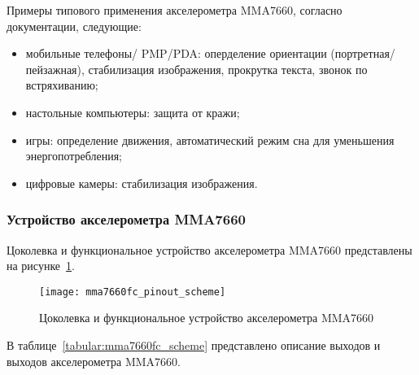 \documentclass[document.tex]{subfiles}
\begin{document}
\noindent
Примеры типового применения акселерометра MMA7660, согласно документации, следующие:
\begin{itemize} 
	\item мобильные телефоны/ PMP/PDA: оперделение ориентации (портретная/пейзажная), стабилизация изображения, прокрутка текста, звонок по встряхиванию;
	\item настольные компьютеры: защита от кражи;
	\item игры: определение движения, автоматический режим сна для уменьшения энерго\-потребления;
	\item цифровые камеры: стабилизация изображения. \cite{accelerometer_mma7660}
\end{itemize}

\clearpage
\subsubsection{Устройство акселерометра MMA7660}
Цоколевка и функциональное устройство акселерометра MMA7660 представлены на ри\-сунке~\ref{fig:mma7660fc_pinout_scheme}.

\begin{figure}[here]
\centering
\texttt{[image: mma7660fc\_pinout\_scheme]}
\caption{Цоколевка и функциональное устройство акселерометра MMA7660}
\label{fig:mma7660fc_pinout_scheme}
\end{figure}

В таблице~\ref{tabular:mma7660fc_scheme} представлено описание выходов и выходов акселерометра MMA7660. 

\begin{table}[h]
\medskip
{}
\medskip
\caption{Общие характеристики цифровых акселерометров}
\label{tabular:mma7660fc_scheme}
\end{table}
\end{document}
